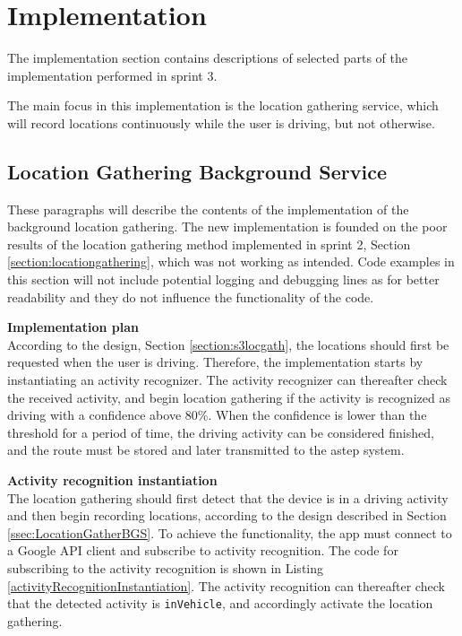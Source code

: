 \section{Implementation}
The implementation section contains descriptions of selected parts of the implementation performed in sprint 3.

The main focus in this implementation is the location gathering service, which will record locations continuously while the user is driving, but not otherwise. 

\subsection{Location Gathering Background Service}
These paragraphs will describe the contents of the implementation of the background location gathering.
The new implementation is founded on the poor results of the location gathering method implemented in sprint 2, Section \ref{section:locationgathering}, which was not working as intended.
Code examples in this section will not include potential logging and debugging lines as for better readability and they do not influence the functionality of the code.

\textbf{Implementation plan}\\
According to the design, Section \ref{section:s3locgath}, the locations should first be requested when the user is driving.
Therefore, the implementation starts by instantiating an activity recognizer.
The activity recognizer can thereafter check the received activity, and begin location gathering if the activity is recognized as driving with a confidence above 80\%.
When the confidence is lower than the threshold for a period of time, the driving activity can be considered finished, and the route must be stored and later transmitted to the \gls{astep} system.


\textbf{Activity recognition instantiation}\\
The location gathering should first detect that the device is in a driving activity and then begin recording locations, according to the design described in Section \ref{ssec:LocationGatherBGS}.
To achieve the functionality, the app must connect to a Google API client and subscribe to activity recognition.
The code for subscribing to the activity recognition is shown in Listing \ref{activityRecognitionInstantiation}.
The activity recognition can thereafter check that the detected activity is \texttt{inVehicle}, and accordingly activate the location gathering.

